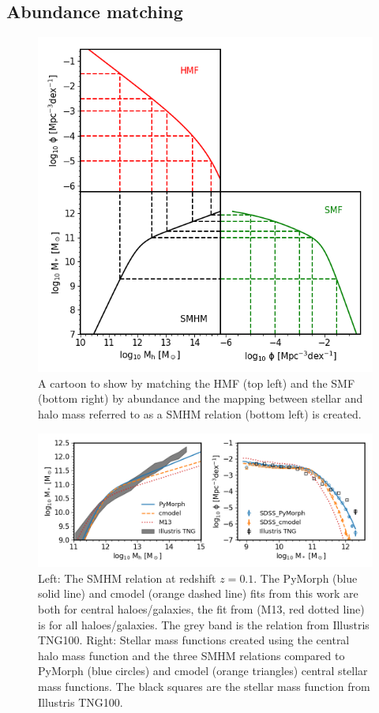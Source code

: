 \subsection{Abundance matching}
\begin{figure}[h]
	\centering
	\includegraphics[width = \linewidth]{Figures/Chapter2/AbundaceMatching.png}
    \caption{A cartoon to show by matching the HMF (top left) and the SMF (bottom right) by abundance and the mapping between stellar and halo mass referred to as a SMHM relation (bottom left) is created.}
	\label{fig:Abn_Toon}
\end{figure}

\begin{figure}[h]
	\centering
	\includegraphics[width = \linewidth]{Figures/Chapter2/AbundaceMtch_Data.png}
    \caption{Left: The SMHM relation at redshift $z=0.1$. The PyMorph (blue solid line) and cmodel (orange dashed line) fits from this work are both for central haloes/galaxies, the fit from \citet{Moster2013} (M13, red dotted line) is for all haloes/galaxies. The grey band is the relation from Illustris TNG100. Right: Stellar mass functions created using the central halo mass function and the three SMHM relations compared to PyMorph (blue circles) and cmodel (orange triangles) central stellar mass functions. The black squares are the stellar mass function from Illustris TNG100.}
	\label{fig:Abn_Data}
\end{figure}

